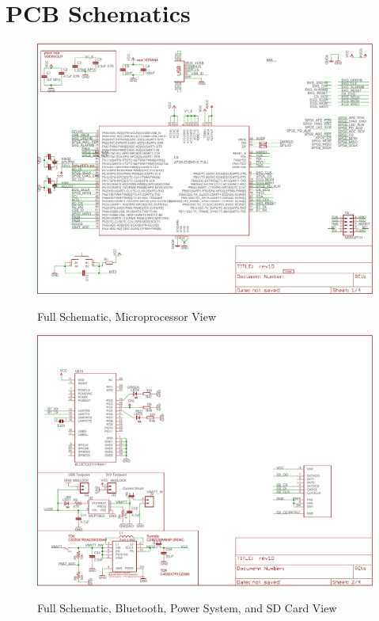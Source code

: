 \appendix
\renewcommand{\cftchappresnum}{Appendix }
\apendixStyle
\apendixSecStyle



\chapter{PCB Schematics}
\label{chap:PCB_Schematics}
\begin{figure}
	\begin{center}
		\label{fig:FullSchematic_Sheet1}
			\includegraphics[angle=90,scale=1,width=1\textwidth]{Images/rev1D_sheet1-cropped.pdf} 
		\caption{Full Schematic, Microprocessor View}
	\end{center}
\end{figure}

\begin{figure}
	\begin{center}
		\label{fig:FullSchematic_Sheet2}
		\includegraphics[angle=90,scale=1,width=1\textwidth]{Images/rev1D_sheet2-cropped.pdf} 
		\caption{Full Schematic, Bluetooth, Power System, and SD Card View}
	\end{center}
\end{figure}

